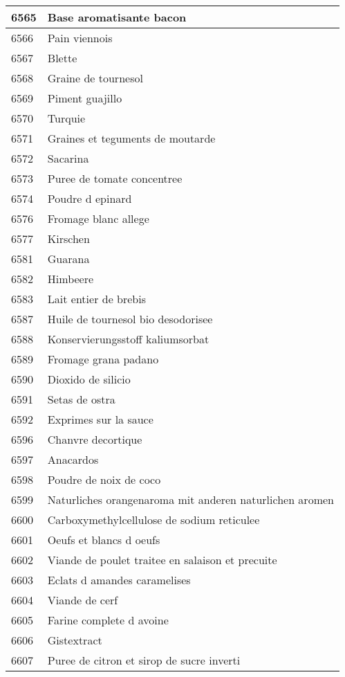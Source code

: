 \begin{longtable}{|l|l|}
6565 & Base aromatisante bacon \\ \hline 
6566 & Pain viennois \\ \hline 
6567 & Blette \\ \hline 
6568 & Graine de tournesol \\ \hline 
6569 & Piment guajillo \\ \hline 
6570 & Turquie \\ \hline 
6571 & Graines et teguments de moutarde \\ \hline 
6572 & Sacarina \\ \hline 
6573 & Puree de tomate concentree \\ \hline 
6574 & Poudre d epinard \\ \hline 
6576 & Fromage blanc allege \\ \hline 
6577 & Kirschen \\ \hline 
6581 & Guarana \\ \hline 
6582 & Himbeere \\ \hline 
6583 & Lait entier de brebis \\ \hline 
6587 & Huile de tournesol bio desodorisee \\ \hline 
6588 & Konservierungsstoff kaliumsorbat \\ \hline 
6589 & Fromage grana padano \\ \hline 
6590 & Dioxido de silicio \\ \hline 
6591 & Setas de ostra \\ \hline 
6592 & Exprimes sur la sauce \\ \hline 
6596 & Chanvre decortique \\ \hline 
6597 & Anacardos \\ \hline 
6598 & Poudre de noix de coco \\ \hline 
6599 & Naturliches orangenaroma mit anderen naturlichen aromen \\ \hline 
6600 & Carboxymethylcellulose de sodium reticulee \\ \hline 
6601 & Oeufs et blancs d oeufs \\ \hline 
6602 & Viande de poulet traitee en salaison et precuite \\ \hline 
6603 & Eclats d amandes caramelises \\ \hline 
6604 & Viande de cerf \\ \hline 
6605 & Farine complete d avoine \\ \hline 
6606 & Gistextract \\ \hline 
6607 & Puree de citron et sirop de sucre inverti \\ \hline 

\end{longtable}
